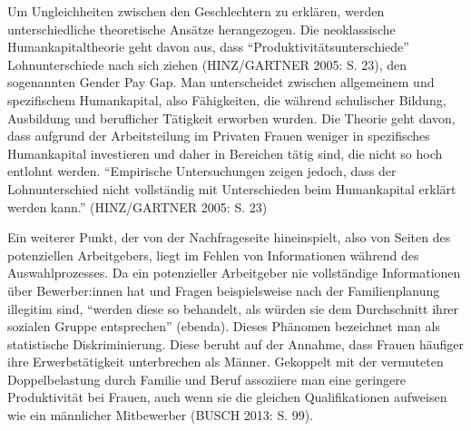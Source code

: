 \documentclass[a4paper,
fontsize=11pt,
oneside,
numbers=noperiodatend,
parskip=half-,
bibliography=totoc,
final
]{scrartcl}
\begin{document}
Um Ungleichheiten zwischen den Geschlechtern zu erklären, werden
unterschiedliche theoretische Ansätze herangezogen. Die neoklassische
Humankapitaltheorie geht davon aus, dass
\enquote{Produktivitätsunterschiede} Lohnunterschiede nach sich ziehen
(HINZ/GARTNER 2005: S. 23), den sogenannten Gender Pay Gap. Man
unterscheidet zwischen allgemeinem und spezifischem Humankapital, also
Fähigkeiten, die während schulischer Bildung, Ausbildung und beruflicher
Tätigkeit erworben wurden. Die Theorie geht davon, dass aufgrund der
Arbeitsteilung im Privaten Frauen weniger in spezifisches Humankapital
investieren und daher in Bereichen tätig sind, die nicht so hoch
entlohnt werden. \enquote{Empirische Untersuchungen zeigen jedoch, dass
der Lohnunterschied nicht vollständig mit Unterschieden beim
Humankapital erklärt werden kann.} (HINZ/GARTNER 2005: S. 23)

Ein weiterer Punkt, der von der Nachfrageseite hineinspielt, also von
Seiten des potenziellen Arbeitgebers, liegt im Fehlen von Informationen
während des Auswahlprozesses. Da ein potenzieller Arbeitgeber nie
vollständige Informationen über Bewerber:innen hat und Fragen
beispielsweise nach der Familienplanung illegitim sind, \enquote{werden
diese so behandelt, als würden sie dem Durchschnitt ihrer sozialen
Gruppe entsprechen} (ebenda). Dieses Phänomen bezeichnet man als
statistische Diskriminierung. Diese beruht auf der Annahme, dass Frauen
häufiger ihre Erwerbstätigkeit unterbrechen als Männer. Gekoppelt mit
der vermuteten Doppelbelastung durch Familie und Beruf assoziiere man
eine geringere Produktivität bei Frauen, auch wenn sie die gleichen
Qualifikationen aufweisen wie ein männlicher Mitbewerber (BUSCH 2013: S.
99).
\end{document}
